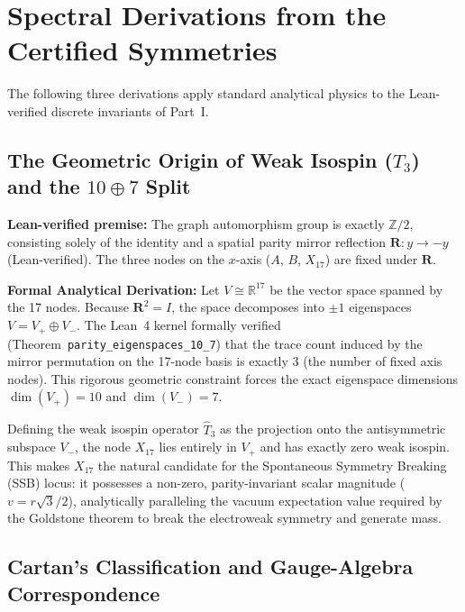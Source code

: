 \documentclass[12pt, a4paper]{article}
\begin{document}
\section{Spectral Derivations from the Certified Symmetries}\label{sec:spectral_proofs}

The following three derivations apply standard analytical physics to the Lean-verified discrete invariants of Part~I.

\subsection{The Geometric Origin of Weak Isospin ($T_3$) and the $10 \oplus 7$ Split}

\noindent\textbf{Lean-verified premise:} The graph automorphism group is exactly $\mathbb{Z}/2$, consisting solely of the identity and a spatial parity mirror reflection $\mathbf{R}: y \to -y$ (Lean-verified). The three nodes on the $x$-axis ($A$, $B$, $X_{17}$) are fixed under $\mathbf{R}$.

\noindent\textbf{Formal Analytical Derivation:} Let $V \cong \mathbb{R}^{17}$ be the vector space spanned by the 17 nodes. Because $\mathbf{R}^2 = I$, the space decomposes into $\pm 1$ eigenspaces $V = V_{+} \oplus V_{-}$. The Lean~4 kernel formally verified (Theorem~\texttt{parity\_eigenspaces\_10\_7}) that the trace count induced by the mirror permutation on the 17-node basis is exactly 3 (the number of fixed axis nodes). This rigorous geometric constraint forces the exact eigenspace dimensions $\dim(V_{+}) = 10$ and $\dim(V_{-}) = 7$.

Defining the weak isospin operator $\hat{T}_3$ as the projection onto the antisymmetric subspace $V_{-}$, the node $X_{17}$ lies entirely in $V_{+}$ and has exactly zero weak isospin. This makes $X_{17}$ the natural candidate for the Spontaneous Symmetry Breaking (SSB) locus: it possesses a non-zero, parity-invariant scalar magnitude ($v = r\sqrt{3}/2$), analytically paralleling the vacuum expectation value required by the Goldstone theorem to break the electroweak symmetry and generate mass.

\subsection{Cartan's Classification and Gauge-Algebra Correspondence}
\end{document}
